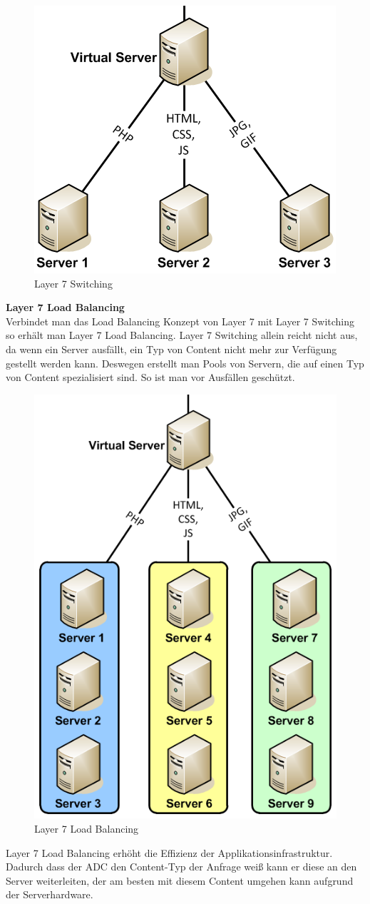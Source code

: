 \begin{figure}[!h]
	\begin{center}
		\includegraphics[width=0.3\linewidth]{images/loadbalancing5.jpg}
		\caption{Layer 7 Switching \cite{LoadBalancing2}}
		\label{Layer 7 Switching}
	\end{center}
\end{figure}

\textbf{Layer 7 Load Balancing} \\
Verbindet man das Load Balancing Konzept von Layer 7 mit Layer 7 Switching so erhält man Layer 7 Load Balancing. Layer 7 Switching allein reicht nicht aus, da wenn ein Server ausfällt, ein Typ von Content nicht mehr zur Verfügung gestellt werden kann. Deswegen erstellt man Pools von Servern, die auf einen Typ von Content spezialisiert sind. So ist man vor Ausfällen geschützt. 
\pagebreak
\begin{figure}[!h]
	\begin{center}
		\includegraphics[width=0.3\linewidth]{images/loadbalancing6.jpg}
		\caption{Layer 7 Load Balancing \cite{LoadBalancing2}}
		\label{Layer 7 Load Balancing}
	\end{center}
\end{figure}

Layer 7 Load Balancing erhöht die Effizienz der Applikationsinfrastruktur. Dadurch dass der ADC den Content-Typ der Anfrage weiß kann er diese an den Server weiterleiten, der am besten mit diesem Content umgehen kann aufgrund der Serverhardware. \cite{LoadBalancing3}

